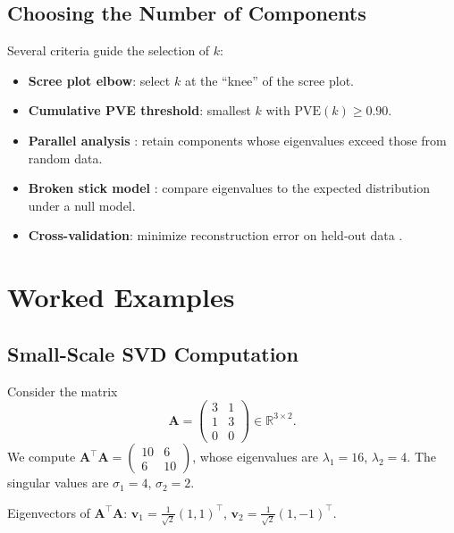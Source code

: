 \documentclass[conference]{IEEEtran}
\begin{document}
\subsection{Choosing the Number of Components}

Several criteria guide the selection of $k$:
\begin{itemize}
  \item \textbf{Scree plot elbow}: select $k$ at the ``knee'' of the scree plot.
  \item \textbf{Cumulative PVE threshold}: smallest $k$ with $\text{PVE}(k) \geq 0.90$.
  \item \textbf{Parallel analysis} \cite{horn1965}: retain components whose eigenvalues exceed those from random data.
  \item \textbf{Broken stick model} \cite{jackson1993}: compare eigenvalues to the expected distribution under a null model.
  \item \textbf{Cross-validation}: minimize reconstruction error on held-out data \cite{bro2008}.
\end{itemize}

\section{Worked Examples}
\label{sec:examples}

\subsection{Small-Scale SVD Computation}

Consider the matrix
\begin{equation}
\mathbf{A} = \begin{pmatrix} 3 & 1 \\ 1 & 3 \\ 0 & 0 \end{pmatrix} \in \mathbb{R}^{3 \times 2}.
\end{equation}
We compute $\mathbf{A}^\top\mathbf{A} = \begin{pmatrix}10 & 6 \\ 6 & 10\end{pmatrix}$, whose eigenvalues are $\lambda_1 = 16$, $\lambda_2 = 4$. The singular values are $\sigma_1 = 4$, $\sigma_2 = 2$.

Eigenvectors of $\mathbf{A}^\top\mathbf{A}$: $\mathbf{v}_1 = \frac{1}{\sqrt{2}}(1,1)^\top$, $\mathbf{v}_2 = \frac{1}{\sqrt{2}}(1,-1)^\top$.
\end{document}

